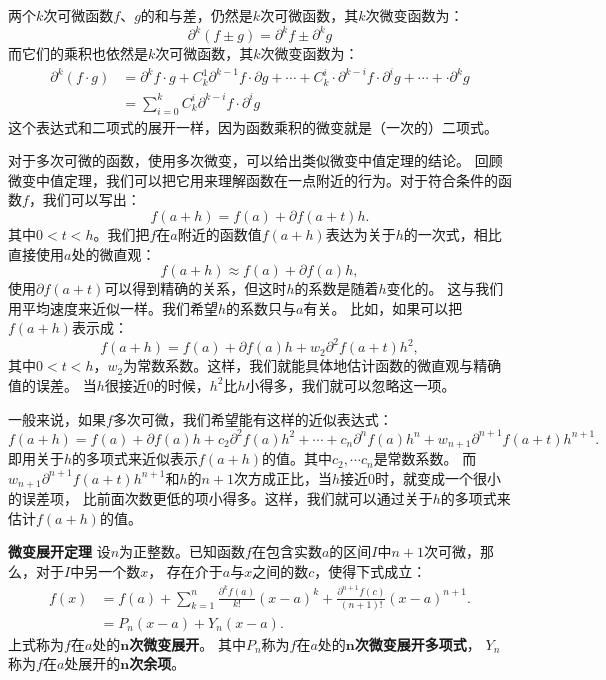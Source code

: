 \documentclass[12pt,UTF8]{ctexbook}
\begin{document}
两个$k$次可微函数$f$、$g$的和与差，仍然是$k$次可微函数，其$k$次微变函数为：
$$ \partial^k (f \pm g) = \partial^k f \pm \partial^k g $$
而它们的乘积也依然是$k$次可微函数，其$k$次微变函数为：
\begin{align*}
    \partial^k (f \cdot g) &= \partial^k f \cdot g + C_k^1 \partial^{k-1} f \cdot \partial g + \cdots + C_k^i \cdot \partial^{k-i} f \cdot  \partial^i g + \cdots + \cdot \partial^{k} g  \\
    &= \sum_{i=0}^k C_k^i \partial^{k-i} f \cdot  \partial^i g 
\end{align*}
这个表达式和二项式的展开一样，因为函数乘积的微变就是（一次的）二项式。

对于多次可微的函数，使用多次微变，可以给出类似微变中值定理的结论。
回顾微变中值定理，我们可以把它用来理解函数在一点附近的行为。对于符合条件的函数$f$，我们可以写出：
$$ f(a + h) = f(a) + \partial f(a + t) h.$$
其中$0<t<h$。我们把$f$在$a$附近的函数值$f(a+h)$表达为关于$h$的一次式，相比直接使用$a$处的微直观：
$$ f(a + h) \approx f(a) + \partial f(a) h,$$
使用$\partial f(a + t)$可以得到精确的关系，但这时$h$的系数是随着$h$变化的。
这与我们用平均速度来近似一样。我们希望$h$的系数只与$a$有关。
比如，如果可以把$f(a + h)$表示成：
$$ f(a + h) = f(a) + \partial f(a) h + w_2\partial^2 f(a + t) h^2,$$
其中$0<t<h$，$w_2$为常数系数。这样，我们就能具体地估计函数的微直观与精确值的误差。
当$h$很接近$0$的时候，$h^2$比$h$小得多，我们就可以忽略这一项。

一般来说，如果$f$多次可微，我们希望能有这样的近似表达式：
$$ f(a + h) = f(a) + \partial f(a) h + c_2 \partial^2 f(a) h^2 + \cdots + c_n \partial^n f(a) h^n + w_{n+1}\partial^{n+1} f(a + t) h^{n+1}.$$
即用关于$h$的多项式来近似表示$f(a + h)$的值。其中$c_2, \cdots c_n$是常数系数。
而$w_{n+1}\partial^{n+1} f(a + t) h^{n+1}$和$h$的$n+1$次方成正比，当$h$接近$0$时，就变成一个很小的误差项，
比前面次数更低的项小得多。这样，我们就可以通过关于$h$的多项式来估计$f(a + h)$的值。

\begin{tm}{\textbf{微变展开定理}}
    设$n$为正整数。已知函数$f$在包含实数$a$的区间$I$中$n+1$次可微，那么，对于$I$中另一个数$x$，
    存在介于$a$与$x$之间的数$c$，使得下式成立：
    \begin{align*}
        f(x) &= f(a) + \sum_{k=1}^n \frac{\partial^k f (a)}{k!}(x - a)^k + \frac{\partial^{n+1} f (c)}{(n+1)!}(x - a)^{n+1}.  \\
        &= P_n(x - a) + Y_n(x - a). 
    \end{align*}
    上式称为$f$在$a$处的$\boldsymbol{n}$\textbf{次微变展开}。
    其中$P_n$称为$f$在$a$处的$\boldsymbol{n}$\textbf{次微变展开多项式}，
    $Y_n$称为$f$在$a$处展开的$\boldsymbol{n}$\textbf{次余项}。
    
\end{tm}
\end{document}
